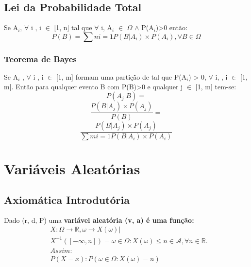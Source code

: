 \documentclass[a4paper,12pt]{article}
\begin{document}
			\subsection{Lei da Probabilidade Total}
				Se A$_i$, $\forall$ i , i $\in$ [1, n] tal que $\forall$ i, A$_i$ $\in$ $\Omega$ $\land$ P(A$_i$)>0 então:
				\begin{equation}
                                          P(B)=\sum{n}{i=1}P(B|A_i)\times P(A_i), \forall B \in \Omega
                                  \end{equation}


				\subsubsection{Teorema de Bayes}
				Se A$_i$ \in \Omega, $\forall$ i , i $\in$ [1, m] formam uma partição de \Omega tal que P(A$_i$) > 0, $\forall$ i, , i $\in$ [1, m]. Então para qualquer evento B com P(B)>0 e qualquer j $\in$ [1, m] tem-se:
				\begin{equation}
					P(A_j | B) =
				\end{equation}
				\begin{equation}
					\frac{P(B|A_j) \times P(A_j)}{P(B)}=
				\end{equation}
				\begin{equation}
					\frac{P(B|A_j) \times P(A_j)}{\sum{m}{i=1} P(B|A_i) \times P(A_i)}
				\end{equation}
	\cleanpage
	\section{Variáveis Aleatórias}
	\subsection{Axiomática Introdutória}
		Dado (r, d, P) uma \bfseries{variável aleatória} (v, a) é uma função:\\
		\begin{equation}
			\begin{split}
				& X: \Omega \longrightarrow \mathbb{R}, \omega \longrightarrow X(\omega) | \\
				& X^{-1} ([-\infty, n]) = { \omega \in \Omega : X(\omega) \leq n } \in \mathcal{A}, \forall n \in \mathbb{R}. \\[0.5cm]
				& Assim: \\
			& P(X=x) : P({\omega \in \Omega : X(\omega )=n })
			\end{split}
		\end{equation}
\end{document}
